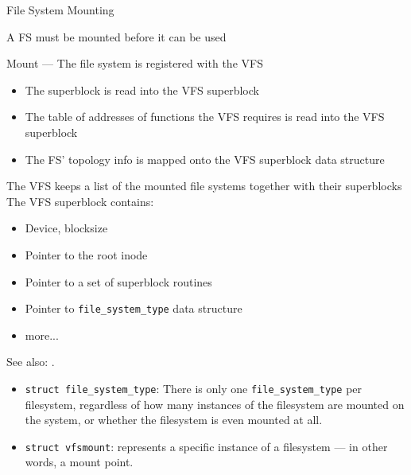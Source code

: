 \begin{frame}{File System Mounting}
  \begin{center}
  \end{center}
\end{frame}

\begin{frame}{A FS must be mounted before it can be used}
  \begin{block}{Mount --- The file system is registered with the VFS}
    \begin{itemize}
    \item The superblock is read into the VFS superblock
    \item The table of addresses of functions the VFS requires is read into the VFS superblock
    \item The FS' topology info is mapped onto the VFS superblock data structure
    \end{itemize}
  \end{block}
  \begin{block}{The VFS keeps a list of the mounted file systems together with
      their superblocks}
    The VFS superblock contains:
    \begin{itemize}
    \item Device, blocksize
    \item Pointer to the \alert{root inode}
    \item Pointer to a set of superblock routines
    \item Pointer to \texttt{file\_system\_type} data structure
    \item more...
    \end{itemize}
  \end{block}
\end{frame}

See also: .
\begin{itemize}
\item \verb|struct file_system_type|: There is only one \verb|file_system_type| per
  filesystem, regardless of how many instances of the filesystem are mounted on the
  system, or whether the filesystem is even mounted at all.
\item \texttt{struct vfsmount}: represents a specific instance of a filesystem --- in other
  words, a mount point.
\end{itemize}

